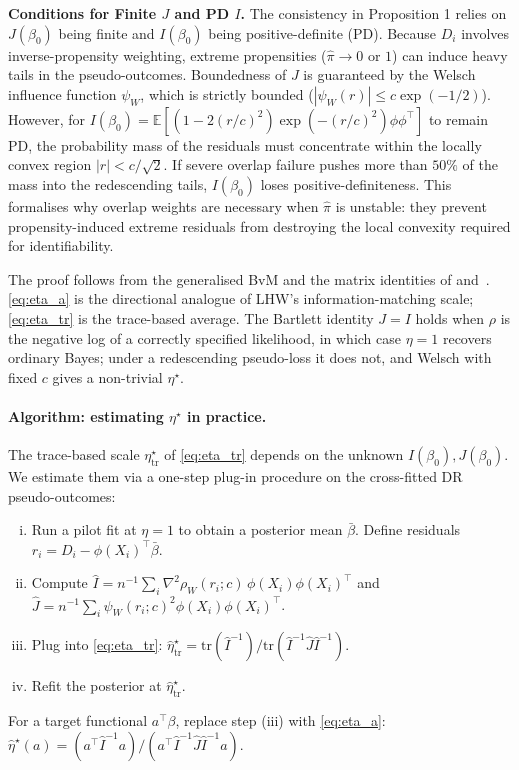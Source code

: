 \textbf{Conditions for Finite $J$ and PD $I$.}
The consistency in Proposition 1 relies on $J(\beta_0)$ being finite
and $I(\beta_0)$ being positive-definite (PD). Because $D_i$ involves
inverse-propensity weighting, extreme propensities ($\hat\pi \to 0$ or $1$)
can induce heavy tails in the pseudo-outcomes. Boundedness of $J$ is guaranteed
by the Welsch influence function $\psi_W$, which is strictly bounded ($|\psi_W(r)| \le c \exp(-1/2)$).
However, for $I(\beta_0) = \mathbb{E}[ (1 - 2(r/c)^2) \exp(-(r/c)^2) \phi \phi^\top ]$
to remain PD, the probability mass of the residuals must concentrate
within the locally convex region $|r| < c/\sqrt{2}$. If severe overlap failure
pushes more than $50\%$ of the mass into the redescending tails, $I(\beta_0)$
loses positive-definiteness. This formalises why overlap weights
\citep{li2018balancing} are necessary when $\hat\pi$ is unstable: they prevent
propensity-induced extreme residuals from destroying the local convexity required
for identifiability.

The proof follows from the generalised BvM
\citep{kleijn2012bernstein} and the matrix identities of
\citet{holmes2017assigning} and~\citet{lyddon2019general}.
\eqref{eq:eta_a} is the directional analogue of LHW's
information-matching scale; \eqref{eq:eta_tr} is the trace-based
average. The Bartlett identity $J = I$ holds when $\rho$ is the
negative log of a correctly specified likelihood, in which case
$\eta = 1$ recovers ordinary Bayes; under a redescending
pseudo-loss it does not, and Welsch with fixed $c$ gives a
non-trivial $\eta^\star$.

\paragraph{Algorithm: estimating $\eta^\star$ in practice.}
The trace-based scale $\eta^\star_\mathrm{tr}$ of \eqref{eq:eta_tr}
depends on the unknown $I(\beta_0), J(\beta_0)$. We estimate them
via a one-step plug-in procedure on the cross-fitted DR
pseudo-outcomes:

\begin{enumerate}[(i),leftmargin=*,itemsep=2pt]
\item Run a pilot fit at $\eta = 1$ to obtain a posterior mean
$\bar\beta$. Define residuals $r_i = D_i - \phi(X_i)^\top \bar\beta$.
\item Compute $\widehat I = n^{-1} \sum_i \nabla^2 \rho_W(r_i; c)\,
\phi(X_i) \phi(X_i)^\top$ and $\widehat J = n^{-1} \sum_i
\psi_W(r_i; c)^2 \phi(X_i) \phi(X_i)^\top$.
\item Plug into \eqref{eq:eta_tr}:
$\hat\eta^\star_\mathrm{tr}
= \mathrm{tr}(\widehat I^{-1}) /
  \mathrm{tr}(\widehat I^{-1} \widehat J \widehat I^{-1})$.
\item Refit the posterior at $\hat\eta^\star_\mathrm{tr}$.
\end{enumerate}
For a target functional $a^\top \beta$, replace step (iii) with
\eqref{eq:eta_a}:
$\hat\eta^\star(a) = (a^\top \widehat I^{-1} a) /
(a^\top \widehat I^{-1} \widehat J \widehat I^{-1} a)$.


